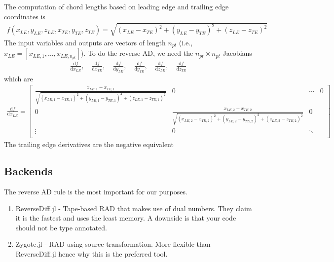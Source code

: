 \documentclass[10pt]{article}
\newcommand{\dd}[2]{\frac{\textrm{d} #1}{\textrm{d} #2}}
\newcommand{\ben}{\begin{eqnarray*}}
\newcommand{\een}{\end{eqnarray*}}
\newcommand{\beq}{\begin{equation}\begin{aligned}}
\newcommand{\eeq}{\end{aligned}\end{equation}}
\begin{document}
The computation of chord lengths based on leading edge and trailing edge coordinates is
\beq
f(x_{LE},y_{LE},z_{LE}, x_{TE},y_{TE},z_{TE}) =
\sqrt{
	\left(x_{LE} - x_{TE}\right)^2
	+
	\left(y_{LE} - y_{TE}\right)^2
	+
	\left(z_{LE} - z_{TE}\right)^2
}
\eeq
The input variables and outputs are vectors of length $n_{pt}$ (i.e., $x_{LE} = [x_{LE,1},\dots,x_{LE,n_{pt}}]$).
To do the reverse AD, we need the $n_{pt}\times n_{pt}$ Jacobians
\ben
\dd{f}{x_{LE}},
\quad
\dd{f}{x_{TE}},
\quad
\dd{f}{y_{LE}},
\quad
\dd{f}{y_{TE}},
\quad
\dd{f}{z_{LE}},
\quad
\dd{f}{z_{TE}}
\een
which are
\beq
\dd{f}{x_{LE}} = \begin{bmatrix}
	\frac{ x_{LE,1}-x_{TE,1} }{ \sqrt{ \left( x_{LE,1}-x_{TE,1} \right)^2 + \left( y_{LE,1} - y_{TE,1} \right)^2 + \left( z_{LE,1}-z_{TE,1} \right)^2 }} & 0                                                                                                                                                    & \cdots & 0 \\
	0                                                                                                                                                    & \frac{ x_{LE,2}-x_{TE,2} }{ \sqrt{ \left( x_{LE,2}-x_{TE,2} \right)^2 + \left( y_{LE,2} - y_{TE,2} \right)^2 + \left( z_{LE,2}-z_{TE,2} \right)^2 }} & 0          \\
	\vdots                                                                                                                                               & 0                                                                                                                                                    & \ddots     \\
\end{bmatrix}
\eeq
The trailing edge derivatives are the negative equivalent


\subsection{Backends}

The reverse AD rule is the most important for our purposes.

\begin{enumerate}
	\item ReverseDiff.jl - Tape-based RAD that makes use of dual numbers. They claim it is the fastest and uses the least memory. A downside is that your code should not be type annotated.
	\item Zygote.jl - RAD using source transformation. More flexible than ReverseDiff.jl hence why this is the preferred tool.
\end{enumerate}
\end{document}
